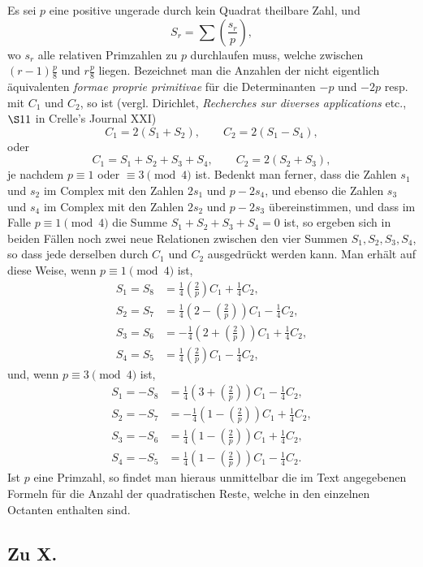 \documentclass[12pt]{article}
\begin{document}
Es sei \(p\) eine positive ungerade durch kein Quadrat theilbare Zahl, und
\[
S_r=\sum\left(\frac{s_r}{p}\right),
\]
wo \(s_r\) alle relativen Primzahlen zu \(p\) durchlaufen muss, welche zwischen \((r-1)\frac p8\) und \(r\frac p8\) liegen. Bezeichnet man die Anzahlen der nicht eigentlich äquivalenten \emph{formae proprie primitivae} für die Determinanten \(-p\) und \(-2p\) resp. mit \(C_1\) und \(C_2\), so ist (vergl. Dirichlet, \emph{Recherches sur diverses applications} etc., \(\S 11\) in Crelle's Journal XXI)
\[
C_1=2(S_1+S_2),\qquad C_2=2(S_1-S_4),
\]
oder
\[
C_1=S_1+S_2+S_3+S_4,\qquad C_2=2(S_2+S_3),
\]
je nachdem \(p\equiv1\) oder \(\equiv3\pmod4\) ist. Bedenkt man ferner, dass die Zahlen \(s_1\) und \(s_2\) im Complex mit den Zahlen \(2s_1\) und \(p-2s_4\), und ebenso die Zahlen \(s_3\) und \(s_4\) im Complex mit den Zahlen \(2s_2\) und \(p-2s_3\) übereinstimmen, und dass im Falle \(p\equiv1\pmod4\) die Summe \(S_1+S_2+S_3+S_4=0\) ist, so ergeben sich in beiden Fällen noch zwei neue Relationen zwischen den vier Summen \(S_1,S_2,S_3,S_4\), so dass jede derselben durch \(C_1\) und \(C_2\) ausgedrückt werden kann. Man erhält auf diese Weise, wenn \(p\equiv1\pmod4\) ist,
\[
\begin{aligned}
S_1=S_8&=\frac14\left(\frac2p\right)C_1+\frac14C_2,\\
S_2=S_7&=\frac14\left(2-\left(\frac2p\right)\right)C_1-\frac14C_2,\\
S_3=S_6&=-\frac14\left(2+\left(\frac2p\right)\right)C_1+\frac14C_2,\\
S_4=S_5&=\frac14\left(\frac2p\right)C_1-\frac14C_2,
\end{aligned}
\]
und, wenn \(p\equiv3\pmod4\) ist,
\[
\begin{aligned}
S_1=-S_8&=\frac14\left(3+\left(\frac2p\right)\right)C_1-\frac14C_2,\\
S_2=-S_7&=-\frac14\left(1-\left(\frac2p\right)\right)C_1+\frac14C_2,\\
S_3=-S_6&=\frac14\left(1-\left(\frac2p\right)\right)C_1+\frac14C_2,\\
S_4=-S_5&=\frac14\left(1-\left(\frac2p\right)\right)C_1-\frac14C_2.
\end{aligned}
\]
Ist \(p\) eine Primzahl, so findet man hieraus unmittelbar die im Text angegebenen Formeln für die Anzahl der quadratischen Reste, welche in den einzelnen Octanten enthalten sind.

\subsection*{Zu X.}
\end{document}
